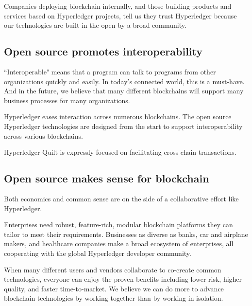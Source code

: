 Companies deploying blockchain internally, and those building products and services based on Hyperledger projects, tell us they trust Hyperledger because our technologies are built in the open by a broad community. 

\subsection{Open source promotes interoperability}
``Interoperable" means that a program can talk to programs from other organizations quickly and easily. In today's connected world, this is a must-have.
And in the future, we believe that many different blockchains will support many business processes for many organizations. 

Hyperledger eases interaction across numerous blockchains. The open source Hyperledger technologies are designed from the start to support interoperability across various blockchains.  

Hyperledger Quilt is expressly focused on facilitating cross-chain transactions.

\subsection{Open source makes sense for blockchain}
Both economics and common sense are on the side of a collaborative effort like Hyperledger. 

Enterprises need robust, feature-rich, modular blockchain platforms they can tailor to meet their requirements. 
Businesses as diverse as banks, car and airplane makers, and healthcare companies make a broad ecosystem of enterprises, all cooperating with the global Hyperledger developer community.

When many different users and vendors collaborate to co-create common technologies, everyone can enjoy the proven benefits including lower risk, higher quality, and faster time-to-market. 
We believe we can do more to advance blockchain technologies by working together than by working in isolation. 
